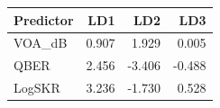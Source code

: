 \begin{tabular}{lrrr}
\toprule
Predictor & LD1 & LD2 & LD3 \\
\midrule
VOA\_dB & 0.907 & 1.929 & 0.005 \\
QBER & 2.456 & -3.406 & -0.488 \\
LogSKR & 3.236 & -1.730 & 0.528 \\
\bottomrule
\end{tabular}
